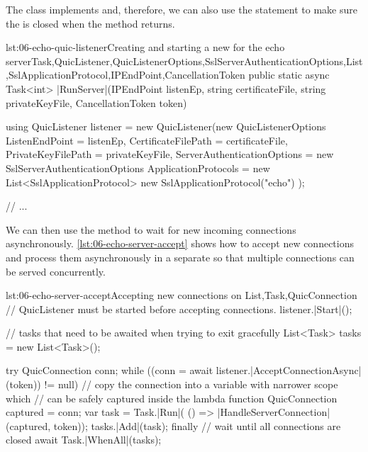 The \QuicListener{} class implements  and, therefore, we can also use the
 statement to make sure the \QuicListener{} is closed when the method returns.

\begin{myListingCsharp}{lst:06-echo-quic-listener}{Creating and starting a new \QuicListener{} for the echo server}{Task,QuicListener,QuicListenerOptions,SslServerAuthenticationOptions,List,SslApplicationProtocol,IPEndPoint,CancellationToken}{}
public static async Task<int> |RunServer|(IPEndPoint listenEp,
    string certificateFile, string privateKeyFile, CancellationToken token)
{
    using QuicListener listener = new QuicListener(new QuicListenerOptions
    {
        ListenEndPoint = listenEp,
        CertificateFilePath = certificateFile,
        PrivateKeyFilePath = privateKeyFile,
        ServerAuthenticationOptions = new SslServerAuthenticationOptions
        {
            ApplicationProtocols = new List<SslApplicationProtocol>
            {
                new SslApplicationProtocol("echo")
            }
        }
    });

    // ...
}
\end{myListingCsharp}

We can then use the  method to wait for new incoming connections
asynchronously. \autoref{lst:06-echo-server-accept} shows how to accept new connections and process
them asynchronously in a separate  so that multiple connections can be served
concurrently.

\begin{myListingCsharp}{lst:06-echo-server-accept}{Accepting new connections on \QuicListener{}}{List,Task,QuicConnection}{}
    // QuicListener must be started before accepting connections.
    listener.|Start|();

    // tasks that need to be awaited when trying to exit gracefully
    List<Task> tasks = new List<Task>();

    try
    {
        QuicConnection conn;
        while ((conn = await listener.|AcceptConnectionAsync|(token)) != null)
        {
            // copy the connection into a variable with narrower scope which
            // can be safely captured inside the lambda function
            QuicConnection captured = conn;
            var task = Task.|Run|(
                () => |HandleServerConnection|(captured, token));
            tasks.|Add|(task);
        }
    }
    finally
    {
        // wait until all connections are closed
        await Task.|WhenAll|(tasks);
    }
\end{myListingCsharp}

